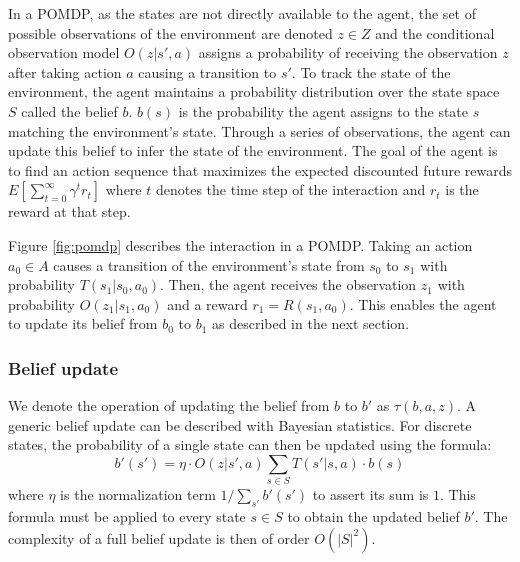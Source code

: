 In a POMDP, as the states are not directly available to the agent, the set of possible observations of the environment are denoted $z \in Z$ and the conditional observation model $O(z|s',a)$ assigns a probability of receiving the observation $z$ after taking action $a$ causing a transition to $s'$.
To track the state of the environment, the agent maintains a probability distribution over the state space $S$ called the belief $b$.
$b(s)$ is the probability the agent assigns to the state $s$ matching the environment's state.
Through a series of observations, the agent can update this belief to infer the state of the environment.
The goal of the agent is to find an action sequence that maximizes the expected discounted future rewards $E\left[\sum_{t=0}^\infty \gamma^t r_t \right]$ where $t$ denotes the time step of the interaction and $r_t$ is the reward at that step. 

Figure \ref{fig:pomdp} describes the interaction in a POMDP. 
Taking an action $a_0 \in A$ causes a transition of the environment's state from $s_0$ to $s_1$ with probability $T(s_1|s_0,a_0)$. 
Then, the agent receives the observation $z_1$ with probability $O(z_1|s_1,a_0)$ and a reward $r_1=R(s_1,a_0)$.
This enables the agent to update its belief from $b_0$ to $b_1$ as described in the next section.

\subsubsection{Belief update}

We denote the operation of updating the belief from $b$ to $b'$ as $\tau(b,a,z)$.
A generic belief update can be described with Bayesian statistics.
For discrete states, the probability of a single state can then be updated using the formula:
\begin{equation}
    b'(s') = \eta \cdot O(z|s',a) \sum_{s \in S} T(s'|s,a) \cdot b(s)
    \label{eq:belief}
\end{equation}
where $\eta$ is the normalization term $1 / \sum_{s'} b'(s')$ to assert its sum is $1$.
This formula must be applied to every state $s \in S$ to obtain the updated belief $b'$.
The complexity of a full belief update is then of order $O(|S|^2)$.

